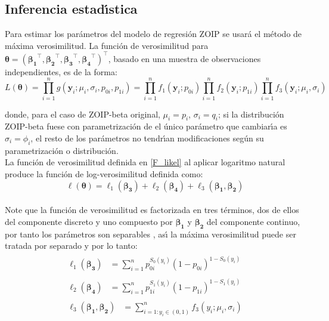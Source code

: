 \subsection{Inferencia estad\'{\i}stica}

Para estimar los par\'{a}metros del modelo de regresi\'{o}n ZOIP se usar\'{a} el m\'{e}todo de m\'{a}xima verosimilitud. La funci\'{o}n de verosimilitud para $\boldsymbol{\theta}=(\boldsymbol{\beta_1}^{\top},\boldsymbol{\beta_2}^{\top},\boldsymbol{\beta_3}^{\top}, \boldsymbol{\beta_4}^{\top})^{\top}$, basado en una muestra de observaciones independientes, es de la forma:
\begin{equation}
L(\boldsymbol{\theta})=\prod_{i=1}^{n}g(\mathbf{y}_i;\mu_i,\sigma_i,p_{0i},p_{1i})=\prod_{i=1}^{n}f_1(\mathbf{y}_i;p_{0i})\prod_{i=1}^{n}f_2(\mathbf{y}_i;p_{1i})\prod_{i=1}^{n}f_3(\mathbf{y}_i;\mu_i,\sigma_i)
\label{F_likel}
\end{equation}


donde, para el caso de ZOIP-beta original, $\mu_i=p_i$, $\sigma_i=q_i$; si la distribuci\'{o}n ZOIP-beta fuese con parametrizaci\'{o}n de \cite{Ferrari2} el \'{u}nico par\'{a}metro que cambiar\'{\i}a es $\sigma_i=\phi_i$, el resto de los par\'{a}metros no tendr\'{\i}an modificaciones seg\'{u}n su parametrizaci\'{o}n o distribuci\'{o}n.\\

La funci\'{o}n de verosimilitud definida en \eqref{F_likel} al aplicar logaritmo natural produce la funci\'{o}n de log-verosimilitud definida como:
\[
\ell(\boldsymbol{\theta})=\ell_1(\boldsymbol{\beta_3})+\ell_2(\boldsymbol{\beta_4})+\ell_3(\boldsymbol{\beta_1},\boldsymbol{\beta_2})
\]
\\
Note que la funci\'{o}n de verosimilitud es factorizada en tres t\'{e}rminos, dos de ellos del componente discreto y uno compuesto por $\boldsymbol{\beta_1}$ y $\boldsymbol{\beta_2}$ del componente continuo, por tanto los par\'{a}metros son separables \citep{Pace1}, as\'{\i} la m\'{a}xima verosimilitud puede ser tratada por separado y por lo tanto:\\
\begin{align*}
\begin{split}
	\ell_1(\boldsymbol{\beta_3}) &= \sum_{i=1}^{n}{p_{0i}^{S_0(y_i)}(1-p_{0i})^{1-S_0(y_i)}}
\end{split}\\
\begin{split}
	\ell_2(\boldsymbol{\beta_4}) &= \sum_{i=1}^{n}{p_{1i}^{S_1(y_i)}(1-p_{1i})^{1-S_1(y_i)}}
\end{split}\\
\begin{split}
	\ell_3(\boldsymbol{\beta_1},\boldsymbol{\beta_2}) &= \sum_{i=1:y_i \in (0,1)}^{n}{f_3(y_i;\mu_i,\sigma_i)} 
\end{split}
\end{align*}

